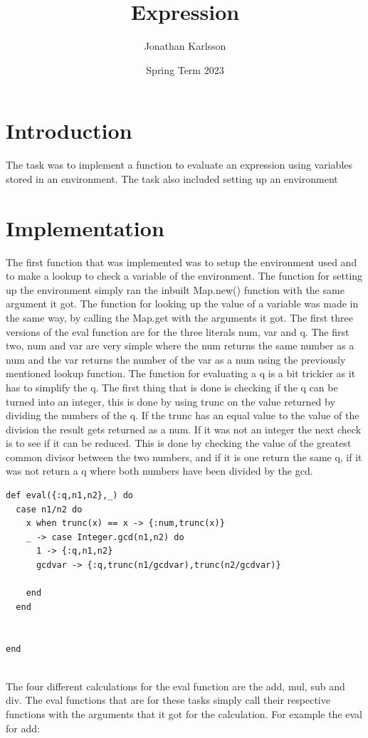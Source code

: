 \documentclass[a4paper,11pt]{article}
\begin{document}
\title{
    \textbf{Expression}
}
\author{Jonathan Karlsson}
\date{Spring Term 2023}

\maketitle

\section*{Introduction}
The task was to implement a function to evaluate an expression using variables stored in an environment. The task also included setting up an environment
\section*{Implementation}
The first function that was implemented was to setup the environment used and to make a lookup to check a variable of the environment. 
The function for setting up the environment simply ran the inbuilt Map.new() function with the same argument it got. The function for looking up the value of a variable was made in the same way, by calling the Map.get with the arguments it got.
The first three versions of the eval function are for the three literals num, var and q. The first two, num and var are very simple where the num returns the same number as a num and the var returns the number of the var as a num using the previously mentioned lookup function.
The function for evaluating a q is a bit trickier as it has to simplify the q. The first thing that is done is checking if the q can be turned into an integer, this is done by using trunc on the value returned by dividing the numbers of the q. If the trunc has an equal value to the value of the division the result gets returned as a num.
If it was not an integer the next check is to see if it can be reduced. This is done by checking the value of the greatest common divisor between the two numbers, and if it is one return the same q, if it was not return a q where both numbers have been divided by the gcd. 
\begin{verbatim}
def eval({:q,n1,n2},_) do
  case n1/n2 do
    x when trunc(x) == x -> {:num,trunc(x)}
    _ -> case Integer.gcd(n1,n2) do
      1 -> {:q,n1,n2}
      gcdvar -> {:q,trunc(n1/gcdvar),trunc(n2/gcdvar)}

    end
  end


end
  
\end{verbatim}
The four different calculations for the eval function are the add, mul, sub and div. The eval functions that are for these tasks simply call their respective functions with the arguments that it got for the calculation. For example the eval for add:
\end{document}

